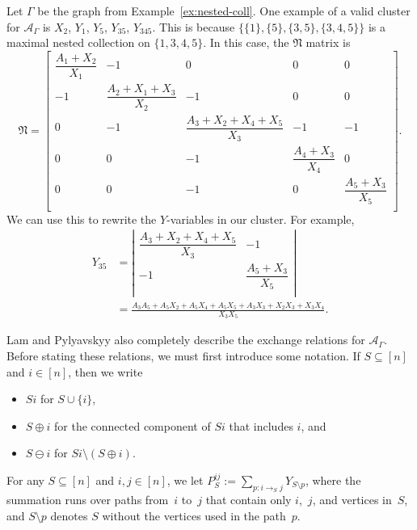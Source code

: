 \documentclass[pdftex]{sigma}
\numberwithin{equation}{section}
\begin{document}
\begin{Example}\label{ex:graph-LP}
Let $\Gamma$ be the graph from Example~\ref{ex:nested-coll}. One example of a valid cluster for $\mathcal{A}_\Gamma$ is $X_2$, $Y_1$, $Y_5$, $Y_{35}$, $Y_{345}$. This is because $\{\{1\}, \{5\}, \{3,5\}, \{3,4,5\}\}$ is a maximal nested collection on $\{1,3,4,5\}$. In this case, the $\mathfrak{N}$ matrix is
\[
\mathfrak{N}=
\begin{bmatrix}
\dfrac{A_1+X_2}{X_1} & -1 & 0 & 0 & 0 \\
-1 & \dfrac{A_2+X_1+X_3}{X_2} & -1 & 0 & 0 \\
0 & -1 & \dfrac{A_3+X_2+X_4+X_5}{X_3} & -1 & -1 \\
0 & 0 & -1 & \dfrac{A_4+X_3}{X_4} & 0 \\
0 & 0 & -1 & 0 & \dfrac{A_5+X_3}{X_5} \\
\end{bmatrix}.
\]
We can use this to rewrite the $Y$-variables in our cluster. For example,
\begin{align*}
Y_{35}& =\left|
\begin{matrix}
\dfrac{A_3+X_2+X_4+X_5}{X_3} & -1 \\
-1 & \dfrac{A_5+X_3}{X_5} \\
\end{matrix}
\right|\\
& =\frac{A_3A_5+A_5X_2+A_5X_4+A_5X_5+A_3X_3+X_2X_3+X_3X_4}{X_3X_5}.
\end{align*}
\end{Example}

Lam and Pylyavskyy also completely describe the exchange relations for $\mathcal{A}_\Gamma$. Before stating these relations, we must first introduce some notation. If $S\subseteq[n]$ and $i\in[n]$, then we write
\begin{itemize}\itemsep=0pt
 \item $Si$ for $S\cup\{i\}$,
 \item $S\oplus i$ for the connected component of $Si$ that includes $i$, and
 \item $S\ominus i$ for $Si\setminus(S\oplus i)$.
\end{itemize}
For any $S\subseteq[n]$ and $i,j\in[n]$, we let $P_S^{ij} :=\sum_{p:i\to_S j}Y_{S\setminus p}$, where the summation runs over paths from~$i$ to~$j$ that contain only $i$,~$j$, and vertices in~$S$, and $S\setminus p$ denotes $S$ without the vertices used in the path~$p$.
\end{document}
